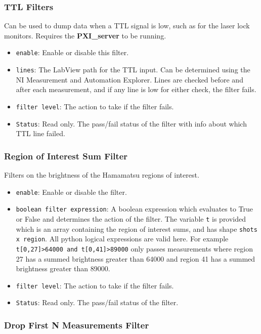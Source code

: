 \documentclass[pdftex,11pt,letterpaper]{article}
\begin{document}
\subsubsection{TTL Filters}

Can be used to dump data when a TTL signal is low, such as for the laser lock monitors.  Requires the \textbf{PXI\_server} to be running.

\begin{itemize}
\item \texttt{enable}:  Enable or disable this filter.
\item \texttt{lines}:  The LabView path for the TTL input.  Can be determined using the NI Measurement and Automation Explorer.  Lines are checked before and after each measurement, and if any line is low for either check, the filter fails.
\item \texttt{filter level}:  The action to take if the filter fails.
\item \texttt{Status}:  Read only.  The pass/fail status of the filter with info about which TTL line failed.
\end{itemize}

\subsubsection{Region of Interest Sum Filter}

Filters on the brightness of the Hamamatsu regions of interest.

\begin{itemize}
\item \texttt{enable}:  Enable or disable the filter.
\item \texttt{boolean filter expression}:  A boolean expression which evaluates to True or False and determines the action of the filter.  The variable \texttt{t} is provided which is an array containing the region of interest sums, and has shape \texttt{shots x region}.  All python logical expressions are valid here.  For example \texttt{t[0,27]>64000 and t[0,41]>89000} only passes measurements where region 27 has a summed brightness greater than 64000 and region 41 has a summed brightness greater than 89000.
\item \texttt{filter level}:  The action to take if the filter fails.
\item \texttt{Status}:  Read only.  The pass/fail status of the filter.
\end{itemize}

\subsubsection{Drop First N Measurements Filter}
\end{document}
